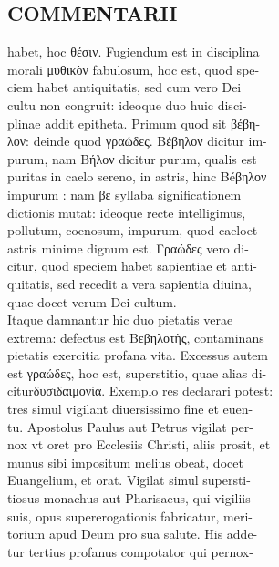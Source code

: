 \documentclass{article}
\begin{document}
\begin{pages}
\section*{COMMENTARII \\
                }habet, hoc θέσιν. Fugiendum est in disciplina \\
                morali μυθικὸν fabulosum, hoc est, quod spe- \\
                ciem habet antiquitatis, sed cum vero Dei \\
                cultu non congruit: ideoque duo huic disci- \\
                plinae addit epitheta. Primum quod sit βέβη- \\
                λον: deinde quod γραώδες. Βέβηλον dicitur im- \\
                purum, nam Βήλον dicitur purum, qualis est \\
                puritas in caelo sereno, in astris, hinc Béβηλον \\
                impurum : nam βε syllaba significationem \\
                dictionis mutat: ideoque recte intelligimus, \\
                pollutum, coenosum, impurum, quod caeloet \\
                astris minime dignum est. Γραώδες vero di- \\
                citur, quod speciem habet sapientiae et anti- \\
                quitatis, sed recedit a vera sapientia diuina, \\
                quae docet verum Dei cultum. \\
                Itaque damnantur hic duo pietatis verae \\
                extrema: defectus est Bεβηλοτὴς, contaminans \\
                pietatis exercitia profana vita. Excessus autem \\
                est γραώδες, hoc est, superstitio, quae alias di- \\
                citurδυσιδαιμονία. Exemplo res declarari potest: \\
                tres simul vigilant diuersissimo fine et euen- \\
                tu. Apostolus Paulus aut Petrus vigilat per- \\
                nox vt oret pro Ecclesiis Christi, aliis prosit, et \\
                munus sibi impositum melius obeat, docet \\
                Euangelium, et orat. Vigilat simul supersti- \\
                tiosus monachus aut Pharisaeus, qui vigiliis \\
                suis, opus supererogationis fabricatur, meri- \\
                torium apud Deum pro sua salute. His adde- \\
                tur tertius profanus compotator qui pernox- \\
                

\end{pages}
\end{document}
